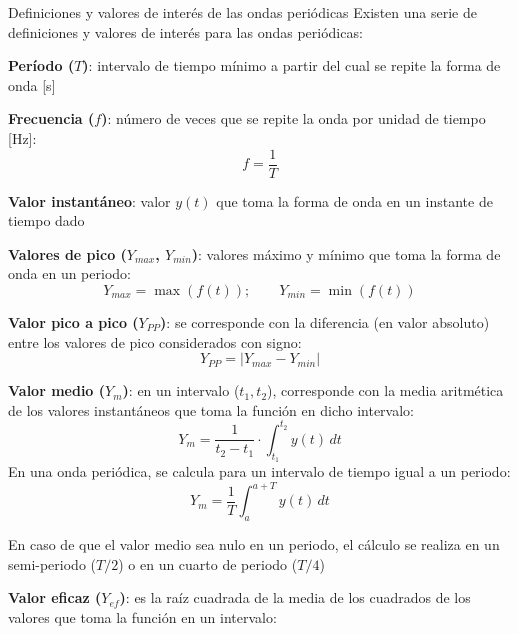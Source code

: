 \documentclass[11pt]{book} %
\makeatletter
\numberwithin{dummy}{section}
\theoremstyle{ocrenumbox}
\theoremstyle{blacknumex}
\theoremstyle{blacknumbox}
\theoremstyle{ocrenum}
\newenvironment{remark}{\par\vspace{10pt}\small %
\begin{list}{}{
\leftmargin=35pt %
\rightmargin=25pt}\item\ignorespaces %
\makebox[-2.5pt]{\begin{tikzpicture}[overlay]
\node[draw=ocre!60,line width=1pt,circle,fill=ocre!25,font=\sffamily\bfseries,inner sep=2pt,outer sep=0pt] at (-15pt,0pt){\textcolor{ocre}{N}};\end{tikzpicture}} %
\advance\baselineskip -1pt}{\end{list}\vskip5pt} %
\renewcommand{\subsubsection}{\@startsection {subsubsection}{3}{\z@}
{-2ex \@plus -0.1ex \@minus -.2ex}
{.2ex \@plus.2ex }
{\normalfont\small\sffamily\bfseries}}
\newlength\esp
\makeatother
\begin{document}
	\subsubsection{Definiciones y valores de interés de las ondas periódicas}
	Existen una serie de definiciones y valores de interés para las ondas periódicas:
	\begin{itemize}
		\item \textbf{Período ($T$)}: intervalo de tiempo mínimo a partir del cual se repite la forma de onda [s]
		\item \textbf{Frecuencia ($f$)}: número de veces que se repite la onda por unidad de tiempo [Hz]:
		\begin{equation*}
			f = \dfrac{1}{T}
		\end{equation*}
		\item \textbf{Valor instantáneo}: valor $y(t)$ que toma la forma de onda en un instante de tiempo dado
		\item \textbf{Valores de pico ($Y_{max}$, $Y_{min}$)}: valores máximo y mínimo que toma la forma de onda en un periodo:
		\begin{equation*}
			Y_{max} = \max(f(t)); \qquad Y_{min} = \min(f(t))
		\end{equation*}
		\item \textbf{Valor pico a pico ($Y_{PP}$)}: se corresponde con la diferencia (en valor absoluto) entre los valores de pico considerados con signo: 
		\begin{equation*}
			Y_{PP}=|Y_{max} - Y_{min}|
		\end{equation*}
		\item \textbf{Valor medio ($Y_m$)}: en un intervalo ($t_1,t_2$), corresponde con la media aritmética de los valores instantáneos que toma la función en dicho intervalo:
		\begin{equation*}
			Y_m=\dfrac{1}{t_2-t_1}\cdot\int_{t_1}^{t_2}y(t)\, dt
		\end{equation*}
		En una onda periódica, se calcula para un intervalo de tiempo igual a un periodo: 
		\begin{equation}\label{eq.valor_medio}
			\boxed{Y_m=\frac{1}{T}\int_{a}^{a+T}y(t)\, dt}
		\end{equation}
		\begin{remark}
			En caso de que el valor medio sea nulo en un periodo, el cálculo se realiza en un semi-periodo ($T/2$) o en un cuarto de periodo ($T/4$)
		\end{remark}
		\item \textbf{Valor eficaz ($Y_{ef}$)}: es la raíz cuadrada de la media de los cuadrados de los valores que toma la función en un intervalo:

\end{itemize}
\end{document}
